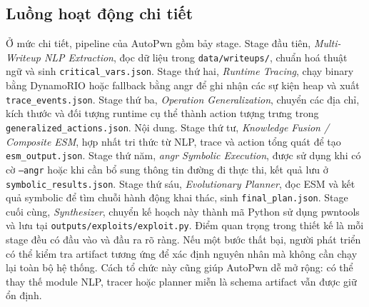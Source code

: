 \documentclass[final]{hcmuitthesis}
\begin{document}
\subsection{Luồng hoạt động chi tiết}
Ở mức chi tiết, pipeline của AutoPwn gồm bảy stage. Stage đầu tiên, \textit{Multi-Writeup NLP Extraction}, đọc dữ liệu trong \texttt{data/writeups/}, chuẩn hoá thuật ngữ và sinh \texttt{critical\_vars.json}. Stage thứ hai, \textit{Runtime Tracing}, chạy binary bằng DynamoRIO hoặc fallback bằng angr để ghi nhận các sự kiện heap và xuất \texttt{trace\_events.json}. Stage thứ ba, \textit{Operation Generalization}, chuyển các địa chỉ, kích thước và đối tượng runtime cụ thể thành action tượng trưng trong \texttt{generalized\_actions.json}.
Nội dung.
Stage thứ tư, \textit{Knowledge Fusion / Composite ESM}, hợp nhất tri thức từ NLP, trace và action tổng quát để tạo \texttt{esm\_output.json}. Stage thứ năm, \textit{angr Symbolic Execution}, được sử dụng khi có cờ \texttt{--angr} hoặc khi cần bổ sung thông tin đường đi thực thi, kết quả lưu ở \texttt{symbolic\_results.json}. Stage thứ sáu, \textit{Evolutionary Planner}, đọc ESM và kết quả symbolic để tìm chuỗi hành động khai thác, sinh \texttt{final\_plan.json}. Stage cuối cùng, \textit{Synthesizer}, chuyển kế hoạch này thành mã Python sử dụng pwntools và lưu tại \texttt{outputs/exploits/exploit.py}.
Điểm quan trọng trong thiết kế là mỗi stage đều có đầu vào và đầu ra rõ ràng. Nếu một bước thất bại, người phát triển có thể kiểm tra artifact tương ứng để xác định nguyên nhân mà không cần chạy lại toàn bộ hệ thống. Cách tổ chức này cũng giúp AutoPwn dễ mở rộng: có thể thay thế module NLP, tracer hoặc planner miễn là schema artifact vẫn được giữ ổn định.
\end{document}
